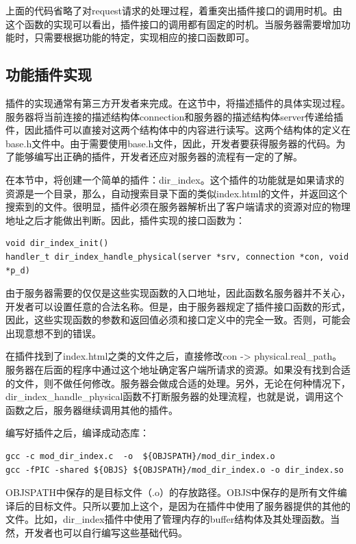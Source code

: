 \documentclass[twoside, xetex]{report}
\begin{document}
	上面的代码省略了对request请求的处理过程，着重突出插件接口的调用时机。由这个函数的实现可以看出，插件接口的调用都有固定的时机。当服务器需要增加功能时，只需要根据功能的特定，实现相应的接口函数即可。
	
	\subsection{功能插件实现}
	
	插件的实现通常有第三方开发者来完成。在这节中，将描述插件的具体实现过程。服务器将当前连接的描述结构体connection和服务器的描述结构体server传递给插件，因此插件可以直接对这两个结构体中的内容进行读写。这两个结构体的定义在base.h文件中。由于需要使用base.h文件，因此，开发者要获得服务器的代码。为了能够编写出正确的插件，开发者还应对服务器的流程有一定的了解。
	
	在本节中，将创建一个简单的插件：dir\_index。这个插件的功能就是如果请求的资源是一个目录，那么，自动搜索目录下面的类似index.html的文件，并返回这个搜索到的文件。很明显，插件必须在服务器解析出了客户端请求的资源对应的物理地址之后才能做出判断。因此，插件实现的接口函数为：
\begin{lstlisting}
void dir_index_init()
handler_t dir_index_handle_physical(server *srv, connection *con, void *p_d)
\end{lstlisting}

	由于服务器需要的仅仅是这些实现函数的入口地址，因此函数名服务器并不关心，开发者可以设置任意的合法名称。但是，由于服务器规定了插件接口函数的形式，因此，这些实现函数的参数和返回值必须和接口定义中的完全一致。否则，可能会出现意想不到的错误。
	
	在插件找到了index.html之类的文件之后，直接修改con -> physical.real\_path。服务器在后面的程序中通过这个地址确定客户端所请求的资源。如果没有找到合适的文件，则不做任何修改。服务器会做成合适的处理。另外，无论在何种情况下，dir\_index\_handle\_physical函数不打断服务器的处理流程，也就是说，调用这个函数之后，服务器继续调用其他的插件。
	
	编写好插件之后，编译成动态库：
\begin{lstlisting}
gcc -c mod_dir_index.c  -o  ${OBJSPATH}/mod_dir_index.o
gcc -fPIC -shared ${OBJS} ${OBJSPATH}/mod_dir_index.o -o dir_index.so
\end{lstlisting}

	OBJSPATH中保存的是目标文件（.o）的存放路径。OBJS中保存的是所有文件编译后的目标文件。只所以要加上这个，是因为在插件中使用了服务器提供的其他的文件。比如，dir\_index插件中使用了管理内存的buffer结构体及其处理函数。当然，开发者也可以自行编写这些基础代码。
	
\end{document}
